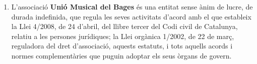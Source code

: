 \documentclass[11pt,a4paper]{article}
\newcommand{\dataconstitucio}{15 de desembre de 1995} %
\newcommand{\UMB}{Unió Musical del Bages\xspace}
\begin{document}




\begin{enumerate}
    \item[] L'associació \textbf{\color{black!60}\UMB} és una entitat sense ànim de lucre, de durada indefinida, que regula les seves activitats d'acord amb el que estableix la Llei 4/2008, de 24 d'abril, del llibre tercer del Codi civil de Catalunya, relatiu a les persones jurídiques; la Llei orgànica 1/2002, de 22 de març, reguladora del dret d'associació, aquests estatuts, i tots aquells acords i normes complementàries que puguin adoptar els seus òrgans de govern.
\end{enumerate}

\end{document}
